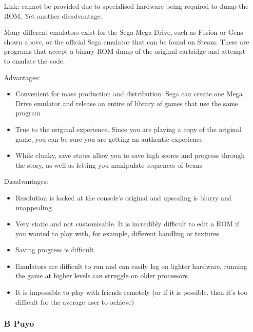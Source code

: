 \documentclass{article}
\begin{document}
Link: cannot be provided due to specialised hardware being required to dump the ROM. Yet another disadvantage.

Many different emulators exist for the Sega Mega Drive, such as Fusion or Gens shown above, or the official Sega emulator that can be found on Steam. These are programs that accept a binary ROM dump of the original cartridge and attempt to emulate the code.
\vspace{0.3cm}

Advantages:

\begin{itemize}
    \renewcommand\labelitemi{--}
    \item Convenient for mass production and distribution.
    Sega can create one Mega Drive emulator and release an entire of library of games that use the same program
    \item True to the original experience.
    Since you are playing a copy of the original game, you can be sure you are getting an authentic experience
    \item While clunky, save states allow you to save high scores and progress through the story, as well as letting you manipulate sequences of beans
\end{itemize}

Disadvantages: 

\begin{itemize}
    \renewcommand\labelitemi{--}
    \item Resolution is locked at the console’s original and upscaling is blurry and unappealing
    \item Very static and not customisable. It is incredibly difficult to edit a ROM if you wanted to play with, for example, different handling or textures
    \item Saving progress is difficult
    \item Emulators are difficult to run and can easily lag on lighter hardware, running the game at higher levels can struggle on older processors
    \item It is impossible to play with friends remotely (or if it is possible, then it’s too difficult for the average user to achieve)
\end{itemize}

\subsubsection{B Puyo}
\end{document}
